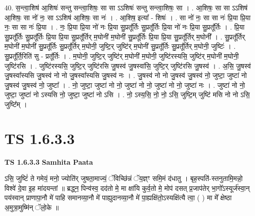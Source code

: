 \documentclass[17pt]{extarticle}
\begin{document}
40. स॒न्त्वा॒शिष॑ आ॒शिषः॑ सन्तु सन्त्वा॒शिषः॒ सा सा ऽऽशिषः॑ सन्तु सन्त्वा॒शिषः॒ सा । . आ॒शिषः॒ सा सा ऽऽशिष॑ आ॒शिषः॒ सा नो॑ नः॒ सा ऽऽशिष॑ आ॒शिषः॒ सा नः॑ । . आ॒शिष॒ इत्या᳚ - शिषः॑ । . सा नो॑ नः॒ सा सा नः॑ प्रि॒या प्रि॒या नः॒ सा सा नः॑ प्रि॒या । . नः॒ प्रि॒या प्रि॒या नो॑ नः प्रि॒या सु॒प्रतू᳚र्तिः सु॒प्रतू᳚र्तिः प्रि॒या नो॑ नः प्रि॒या सु॒प्रतू᳚र्तिः । . प्रि॒या सु॒प्रतू᳚र्तिः सु॒प्रतू᳚र्तिः प्रि॒या प्रि॒या सु॒प्रतू᳚र्तिर् म॒घोनी॑ म॒घोनी॑ सु॒प्रतू᳚र्तिः प्रि॒या प्रि॒या सु॒प्रतू᳚र्तिर् म॒घोनी᳚ । . सु॒प्रतू᳚र्तिर् म॒घोनी॑ म॒घोनी॑ सु॒प्रतू᳚र्तिः सु॒प्रतू᳚र्तिर् म॒घोनी॒ जुष्टि॒र् जुष्टि॑र् म॒घोनी॑ सु॒प्रतू᳚र्तिः सु॒प्रतू᳚र्तिर् म॒घोनी॒ जुष्टिः॑ । . सु॒प्रतू᳚र्ति॒रिति॑ सु - प्रतू᳚र्तिः । . म॒घोनी॒ जुष्टि॒र् जुष्टि॑र् म॒घोनी॑ म॒घोनी॒ जुष्टि॑रस्यसि॒ जुष्टि॑र् म॒घोनी॑ म॒घोनी॒ जुष्टि॑रसि । . जुष्टि॑रस्यसि॒ जुष्टि॒र् जुष्टि॑रसि जु॒षस्व॑ जु॒षस्वा॑सि॒ जुष्टि॒र् जुष्टि॑रसि जु॒षस्व॑ । . अ॒सि॒ जु॒षस्व॑ जु॒षस्वा᳚स्यसि जु॒षस्व॑ नो नो जु॒षस्वा᳚स्यसि जु॒षस्व॑ नः । . जु॒षस्व॑ नो नो जु॒षस्व॑ जु॒षस्व॑ नो॒ जुष्टा॒ जुष्टा॑ नो जु॒षस्व॑ जु॒षस्व॑ नो॒ जुष्टा᳚ । . नो॒ जुष्टा॒ जुष्टा॑ नो नो॒ जुष्टा॑ नो नो॒ जुष्टा॑ नो नो॒ जुष्टा॑ नः । . जुष्टा॑ नो नो॒ जुष्टा॒ जुष्टा॑ नो ऽस्यसि नो॒ जुष्टा॒ जुष्टा॑ नो ऽसि । . नो॒ ऽस्य॒सि॒ नो॒ नो॒ ऽसि॒ जुष्टि॒म् जुष्टि॑ मसि नो नो ऽसि॒ जुष्टि᳚म् । \newline
\pagebreak
{}
\section*{ TS 1.6.3.3 }

\textbf{TS 1.6.3.3 } \newline
\textbf{Samhita Paata} \newline

ऽसि॒ जुष्टिं॑ ते गमेयं॒ मनो॒ ज्योति॑र् जुषता॒माज्यं॒ ॅविच्छि॑न्नं ॅय॒ज्ञ्ꣳ समि॒मं द॑धातु । बृह॒स्पति॑-स्तनुतामि॒मन्नो॒ विश्वे॑ दे॒वा इ॒ह मा॑दयन्तां ॥ ब्रद्ध्न॒ पिन्व॑स्व॒ दद॑तो मे॒ मा क्षा॑यि कुर्व॒तो मे॒ मोप॑ दसत् प्र॒जाप॑तेर् भा॒गो᳚ऽस्यूर्ज॑स्वा॒न् पय॑स्वान् प्राणापा॒नौ मे॑ पाहि समानव्या॒नौ मे॑ पाह्युदानव्या॒नौ मे॑ पा॒ह्यक्षि॑तो॒ऽस्यक्षि॑त्यै त्वा॒ ( ) मा मे᳚ क्षेष्ठा अ॒मुत्रा॒मुष्मि॑न् ॅलो॒के ॥ \newline
\end{document}
